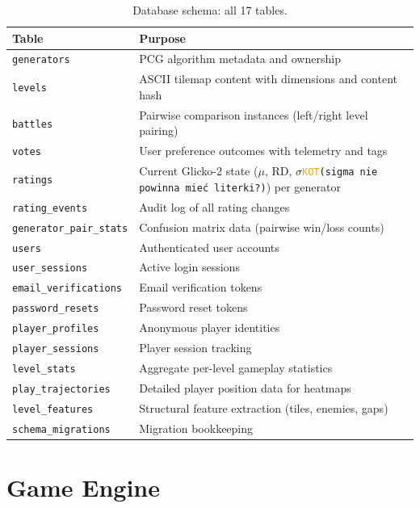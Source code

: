 \documentclass[shortabstract, mgr, english]{iithesis}
\newcommand{\DEBUG}[1]{{#1}} %
\newcommand{\KOT}[1]{\DEBUG{\tt{\textcolor{orange}{KOT}(}{#1}{)}}}
\begin{document}
\begin{table}[H]
\centering
\small
\begin{tabular}{ll}
\toprule
\textbf{Table} & \textbf{Purpose} \\
\midrule
\texttt{generators}          & PCG algorithm metadata and ownership \\
\texttt{levels}              & ASCII tilemap content with dimensions and content hash \\
\texttt{battles}             & Pairwise comparison instances (left/right level pairing) \\
\texttt{votes}               & User preference outcomes with telemetry and tags \\
\texttt{ratings}             & Current Glicko-2 state ($\mu$, RD, $\sigma$\KOT{sigma nie powinna mieć literki?}) per generator \\
\texttt{rating\_events}      & Audit log of all rating changes \\
\texttt{generator\_pair\_stats} & Confusion matrix data (pairwise win/loss counts) \\
\texttt{users}               & Authenticated user accounts \\
\texttt{user\_sessions}      & Active login sessions \\
\texttt{email\_verifications}& Email verification tokens \\
\texttt{password\_resets}    & Password reset tokens \\
\texttt{player\_profiles}    & Anonymous player identities \\
\texttt{player\_sessions}    & Player session tracking \\
\texttt{level\_stats}        & Aggregate per-level gameplay statistics \\
\texttt{play\_trajectories}  & Detailed player position data for heatmaps \\
\texttt{level\_features}     & Structural feature extraction (tiles, enemies, gaps) \\
\texttt{schema\_migrations}  & Migration bookkeeping \\
\bottomrule
\end{tabular}
\caption{Database schema: all 17 tables.}
\label{tab:db-tables}
\end{table}

\section{Game Engine}
\label{sec:sd-engine}
\end{document}
